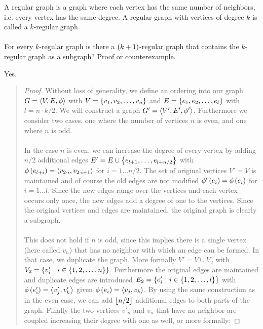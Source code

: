 \documentclass{article}
\begin{document}
\begin{exercise}
A regular graph is a graph where each vertex has the same number of neighbors, i.e. every vertex has the same degree. A regular graph with vertices of degree $k$ is called a $k$-regular graph.
\paragraph{}
For every $k$-regular graph is there a $\left( k+1 \right)$-regular graph that contains the $k$-regular graph as a subgraph? Proof or counterexample.
\begin{answer}
Yes.
\begin{quote}\begin{proof}
Without loss of generality, we define an ordering into our graph $G=\left\langle V,E,\phi \right\rangle$ with $V=\left\{ v_1,v_2,\ldots,v_n \right\}$ and $E=\left\{ e_1,e_2,\ldots,e_l \right\}$ with $l=n\cdot k/2$. We will construct a graph $G'=\left\langle V',E',\phi' \right\rangle$. Furthermore we consider two cases, one where the number of vertices $n$ is even, and one where $n$ is odd.
\paragraph{}In the case $n$ is even, we can increase the degree of every vertex by adding $n/2$ additional edges $E'=E\cup\left\{ e_{l+1},\ldots,e_{l+n/2} \right\}$ with $\phi\left( e_{l+i} \right)=\left\langle v_{2\cdot i},v_{2\cdot i+1} \right\rangle$ for $i=1\ldots n/2$. The set of original vertices $V'=V$ is maintained and of course the old edges are not modified $\phi'\left( e_i \right)=\phi\left( e_i \right)$ for $i=1\ldots l$. Since the new edges range over the vertices and each vertex occurs only once, the new edges add a degree of one to the vertices. Since the original vertices and edges are maintained, the original graph is clearly a subgraph.
\paragraph{}This does not hold if $n$ is odd, since this implies there is a single vertex (here called $v_n$) that has no neighbor with which an edge can be formed. In that case, we duplicate the graph. More formally $V'=V\cup V_2$ with $V_2=\left\{ v'_i\ |\ i\in\left\{ 1,2,\ldots,n \right\} \right\}$. Furthermore the original edges are maintained and duplicate edges are introduced $E_2=\left\{ e'_i\ |\ i\in\left\{ 1,2,\ldots,l \right\} \right\}$ with $\phi\left( e'_i \right)=\left\langle v'_j,v'_k \right\rangle$ given $\phi\left( e_i \right)=\left\langle v_j,v_k \right\rangle$. By using the same construction as in the even case, we can add $\left\lfloor n/2 \right\rfloor$ additional edges to both parts of the graph. Finally the two vertices $v'_n$ and $v_n$ that have no neighbor are coupled increasing their degree with one as well, or more formally:
\end{proof}\end{quote}
\end{answer}
\end{exercise}
\end{document}
